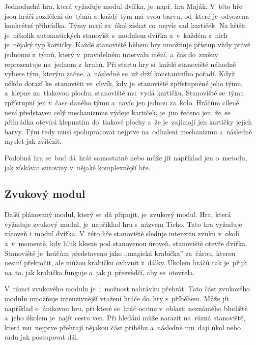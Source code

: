 Jednoduchá hra, která vyžaduje modul dvířka, je~např. hra Maják. %
V~této hře jsou hráči rozděleni do~týmů a~každý tým má~svou barvu, od~které je~odvozena konkrétní přihrádka. 
Týmy mají za~úkol získat co~nejvíc sad kartiček.
Na hřišti je~několik automatických stanovišť s~modulem dvířka a~v~každém z~nich je~nějaký typ kartičky.
Každé stanoviště během hry umožňuje přístup vždy právě jednomu z~týmů, který v~pravidelném intervalu mění, a~čas do~změny reprezentuje na~jednom z~kruhů.
Při startu hry si~každé stanoviště náhodně vybere tým, kterým začne, a~následně se~už drží konstantního pořadí.
Když někdo dorazí ke~stanovišti ve~chvíli, kdy je~stanoviště zpřístupněné jeho týmu, a~klepne na~tlakovou plochu, stanoviště mu~vydá kartičku.
Stanoviště se~týmu zpřístupní jen v~čase daného týmu a~navíc jen jednou za~kolo.
Hráčům cíleně není představen celý mechanizmus výdeje kartiček, je~jim řečeno jen, že~se přihrádka otevírá klepnutím do~tlakové plochy a~že je~zajímají jen kartičky jejich barvy. 
Tým tedy musí spolupracovat nejprve na~odhalení mechanizmu a~následně myslet jak zvítězit.

Podobná hra se~buď dá~hrát samostatně nebo může jít například jen o~metodu, jak získávat suroviny v~nějaké komplexnější hře.

\subsection{Zvukový modul}
Další plánovaný modul, který se~dá připojit, je~zvukový modul.
Hra, která vyžaduje zvukový modul, je~například hra s~názvem Ticho.
Tato hra vyžaduje zároveň i~modul dvířka.
V~této hře stanoviště sleduje intenzitu zvuku v~okolí a~v~momentě, kdy hluk klesne pod stanovenou úroveň, stanoviště otevře dvířka. 
Stanoviště je~hráčům představeno jako ,,magická krabička''\- za~čárou, kterou nesmí překročit, ale můžou krabičku ovlivnit z~dálky.
Úkolem hráčů tak je~přijít na~to, jak krabička funguje a~jak ji~přesvědčí, aby se~otevřela.

V~rámci zvukového modulu je~i~možnost nahrávku přehrát.
Tato část zvukového modulu umožňuje intenzivnější vtažení hráče do~hry s~příběhem.
Může jít například o~únikovou hru, při které se~hráč ocitne v~oblasti neznámého bludiště a~jeho úkolem je~najít cestu ven.
Při hledání může narazit na~různá stanoviště, která mu~nejprve přehrají nějakou část příběhu a~následně mu~dají úkol nebo radu jak postupovat dál.

